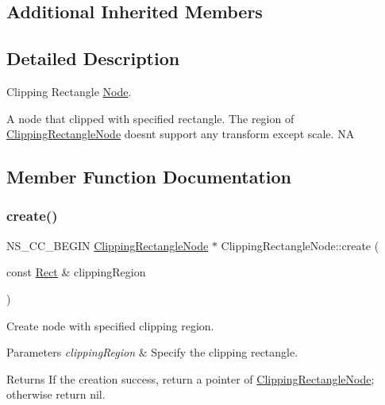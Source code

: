 \subsection*{Additional Inherited Members}


\subsection{Detailed Description}
Clipping Rectangle \hyperlink{classNode}{Node}. 

A node that clipped with specified rectangle. The region of \hyperlink{classClippingRectangleNode}{Clipping\+Rectangle\+Node} doesn\textquotesingle{}t support any transform except scale.  NA 

\subsection{Member Function Documentation}
\mbox{\label{classClippingRectangleNode_ad4837ccec4848abc6139659980152fff}} 
\subsubsection{\texorpdfstring{create()}{create()}\hspace{0.1cm}{\footnotesize\ttfamily [1/4]}}
{\footnotesize\ttfamily N\+S\+\_\+\+C\+C\+\_\+\+B\+E\+G\+IN \hyperlink{classClippingRectangleNode}{Clipping\+Rectangle\+Node} $\ast$ Clipping\+Rectangle\+Node\+::create (\begin{DoxyParamCaption}\item[{const \hyperlink{classRect}{Rect} \&}]{clipping\+Region }\end{DoxyParamCaption})\hspace{0.3cm}{\ttfamily [static]}}



Create node with specified clipping region. 


\begin{DoxyParams}{Parameters}
{\em clipping\+Region} & Specify the clipping rectangle. \\
\hline
\end{DoxyParams}
\begin{DoxyReturn}{Returns}
If the creation success, return a pointer of \hyperlink{classClippingRectangleNode}{Clipping\+Rectangle\+Node}; otherwise return nil. 
\end{DoxyReturn}
\mbox{\label{classClippingRectangleNode_a2889a74ae21277b8e8f142c5b7da4d3a}} 
